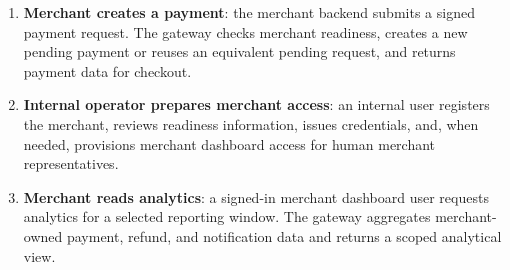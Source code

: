\begin{enumerate}
  \item \textbf{Merchant creates a payment}: the merchant backend submits a
  signed payment request. The gateway checks merchant readiness, creates a new
  pending payment or reuses an equivalent pending request, and returns payment
  data for checkout.
  \item \textbf{Internal operator prepares merchant access}: an internal user
  registers the merchant, reviews readiness information, issues credentials,
  and, when needed, provisions merchant dashboard access for human merchant
  representatives.
  \item \textbf{Merchant reads analytics}: a signed-in merchant dashboard user
  requests analytics for a selected reporting window. The gateway aggregates
  merchant-owned payment, refund, and notification data and returns a scoped
  analytical view.
\end{enumerate}
